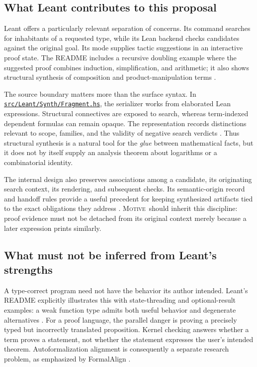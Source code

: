 \documentclass[11pt,a4paper]{article}
\newcommand{\Motive}{\textnormal{\textsc{Motive}}}
\newcommand{\code}[1]{\texttt{\detokenize{#1}}}
\newcommand{\lfile}[1]{\href{https://github.com/VladimirReshetnikov/Leant/blob/c36adf114035fb2fba6c276b63944cc613b31668/#1}{\nolinkurl{#1}}}
\theoremstyle{remark}
\begin{document}
\subsection{What Leant contributes to this proposal}
Leant offers a particularly relevant separation of concerns. Its \code{:synth} command searches for inhabitants of a requested type, while its Lean backend checks candidates against the original goal. Its \code{:prove} mode supplies tactic suggestions in an interactive proof state. The README includes a recursive doubling example where the suggested proof combines induction, simplification, and arithmetic; it also shows structural synthesis of composition and product-manipulation terms \cite{leant-readme}.

The source boundary matters more than the surface syntax. In \lfile{src/Leant/Synth/Fragment.hs}, the serializer works from elaborated Lean expressions. Structural connectives are exposed to search, whereas term-indexed dependent formulas can remain opaque. The representation records distinctions relevant to scope, families, and the validity of negative search verdicts \cite{leant-fragment}. Thus structural synthesis is a natural tool for the \emph{glue} between mathematical facts, but it does not by itself supply an analysis theorem about logarithms or a combinatorial identity.

The internal design also preserves associations among a candidate, its originating search context, its rendering, and subsequent checks. Its semantic-origin record and handoff rules provide a useful precedent for keeping synthesized artifacts tied to the exact obligations they address \cite{leant-internals}. \Motive\ should inherit this discipline: proof evidence must not be detached from its original context merely because a later expression prints similarly.

\subsection{What must not be inferred from Leant's strengths}
A type-correct program need not have the behavior its author intended. Leant's README explicitly illustrates this with state-threading and optional-result examples: a weak function type admits both useful behavior and degenerate alternatives \cite{leant-readme}. For a proof language, the parallel danger is proving a precisely typed but incorrectly translated proposition. Kernel checking answers whether a term proves a statement, not whether the statement expresses the user's intended theorem. Autoformalization alignment is consequently a separate research problem, as emphasized by FormalAlign \cite{formalign}.
\end{document}
